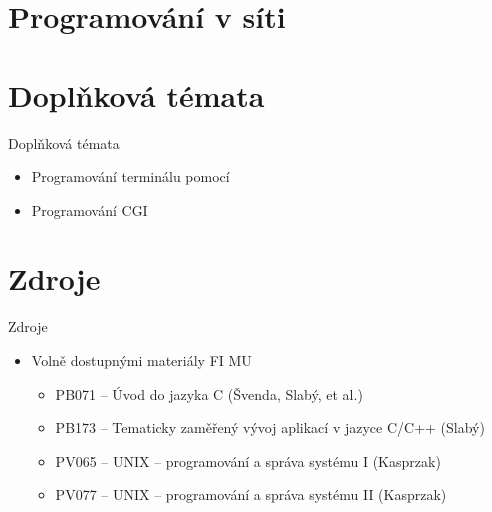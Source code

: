 \section{Programování v síti}
\frame{\sectionpage}



\section*{Doplňková témata}
\frame{\sectionpage}

\begin{frame}{Doplňková témata}

  \begin{itemize}
    \item Programování terminálu pomocí 
    \item Programování CGI
  \end{itemize}

\end{frame}

\section*{Zdroje}
\frame{\sectionpage}

\begin{frame}{Zdroje}

  \begin{itemize}
    \item Volně dostupnými materiály FI MU
    \begin{itemize}
      \item PB071 -- Úvod do jazyka C (Švenda, Slabý, et al.)
      \item PB173 -- Tematicky zaměřený vývoj aplikací v jazyce C/C++ (Slabý)
      \item PV065 -- UNIX -- programování a správa systému I (Kasprzak)
      \item PV077 -- UNIX -- programování a správa systému II (Kasprzak)
    \end{itemize}
  \end{itemize}

\end{frame}


